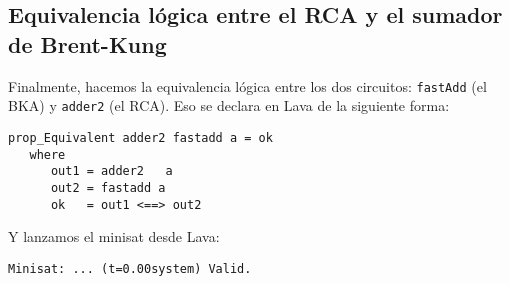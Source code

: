 \subsection{Equivalencia lógica entre el RCA y el sumador de Brent-Kung}
Finalmente, hacemos la equivalencia lógica entre los dos circuitos: {\footnotesize\verb|fastAdd|} (el BKA) y {\footnotesize\verb|adder2|} (el RCA). Eso se declara en Lava de la siguiente forma:
{\footnotesize
\begin{verbatim}
prop_Equivalent adder2 fastadd a = ok
   where
      out1 = adder2   a
      out2 = fastadd a
      ok   = out1 <==> out2
\end{verbatim}
}
Y lanzamos el minisat desde Lava:
{\footnotesize
\begin{verbatim}
Minisat: ... (t=0.00system) Valid.
\end{verbatim}
}
